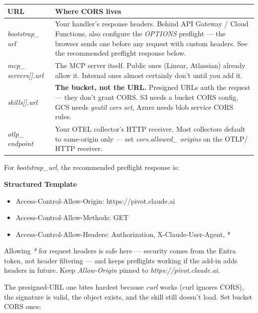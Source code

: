 \documentclass[11pt]{article}
\begin{document}
\begingroup
\small
\setlength{\tabcolsep}{2pt}
\begin{longtable}{>{\RaggedRight\arraybackslash\hspace{0pt}}p{}>{\RaggedRight\arraybackslash\hspace{0pt}}p{}}
\toprule
{} \textbf{URL} & \textbf{Where CORS lives} \\
\midrule
{} \emph{bootstrap\_\allowbreak{} url} & Your handler's response headers. Behind API Gateway /  Cloud Functions, also configure the \emph{OPTIONS} preflight — the browser sends one before any request with custom headers. See the recommended preflight response below. \\
{} \emph{mcp\_\allowbreak{} servers[].url} & The MCP server itself. Public ones (Linear, Atlassian) already allow it. Internal ones almost certainly don't until you add it. \\
{} \emph{skills[].url} & \textbf{The bucket, not the URL.} Presigned URLs auth the request — they don't grant CORS. S3 needs a bucket CORS config, GCS needs \emph{gsutil cors set}, Azure needs blob service CORS rules. \\
{} \emph{otlp\_\allowbreak{} endpoint} & Your OTEL collector's HTTP receiver. Most collectors default to same-origin only — set \emph{cors.allowed\_\allowbreak{} origins} on the OTLP/ HTTP receiver. \\
\bottomrule
\end{longtable}
\endgroup

For \emph{bootstrap\_\allowbreak{}url}, the recommended preflight response is:


\textbf{Structured Template}
\begin{itemize}[leftmargin=*,itemsep=2pt,topsep=2pt]
\item {} Access-Control-Allow-Origin: https://pivot.claude.ai
\item {} Access-Control-Allow-Methods: GET
\item {} Access-Control-Allow-Headers: Authorization, X-Claude-User-Agent, *
\end{itemize}

Allowing \emph{*} for request headers is safe here — security comes from the Entra token, not header filtering — and keeps preflights working if the add-in adds headers in future. Keep \emph{Allow-Origin} pinned to \emph{https://pivot.claude.ai}.


The presigned-URL one bites hardest because \emph{curl} works (curl ignores CORS), the signature is valid, the object exists, and the skill still doesn't load. Set bucket CORS once:
\end{document}
